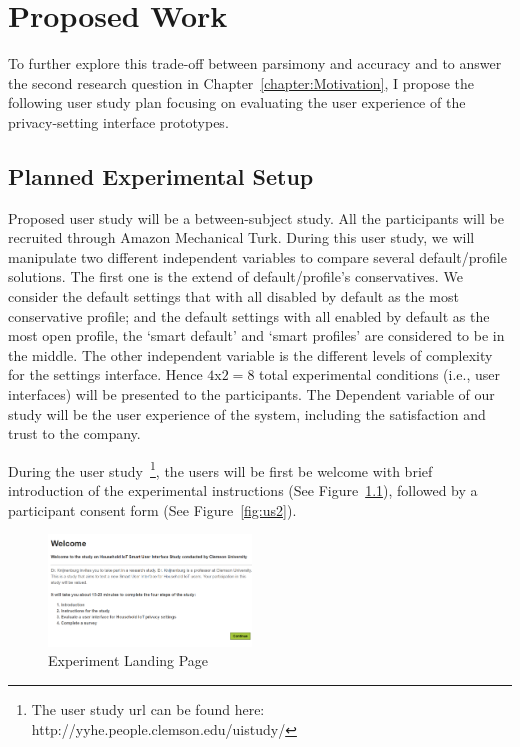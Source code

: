 \chapter{Proposed Work}

To further explore this trade-off between parsimony and accuracy and to answer the second research question in Chapter~\ref{chapter:Motivation}, I propose the following user study plan focusing on evaluating the user experience of the privacy-setting interface prototypes.

\section{Planned Experimental Setup}
Proposed user study will be a between-subject study. All the participants will be recruited through Amazon Mechanical Turk. During this user study, we will manipulate two different independent variables to compare several default/profile solutions. The first one is the extend of default/profile's conservatives. We consider the default settings that with all disabled by default as the most conservative profile; and the default settings with all enabled by default as the most open profile, the `smart default' and `smart profiles' are considered to be in the middle. The other independent variable is the different levels of complexity for the settings interface. Hence $4$x$2=8$ total experimental conditions (i.e., user interfaces) will be presented to the participants. The Dependent variable of our study will be the user experience of the system, including the satisfaction and trust to the company.

During the user study~\footnote{The user study url can be found here: http://yyhe.people.clemson.edu/uistudy/}, the users will be first be welcome with brief introduction of the experimental instructions (See Figure~\ref{fig:us1}), followed by a participant consent form (See Figure~\ref{fig:us2}).

\begin{figure}
	\centering
	\includegraphics[width=0.48\textwidth]{figures/userstudy1.png}
	\caption{Experiment Landing Page}
	\label{fig:us1}
\end{figure}

